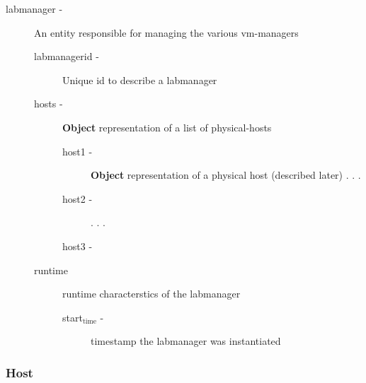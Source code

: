 \documentclass[11pt]{article}
\begin{document}
\begin{description}
\item [labmanager -] An entity responsible for managing the various vm-managers

\begin{description}
\item [labmanagerid -] Unique id to describe a labmanager
\item [hosts -] \textbf{Object} representation of a list of physical-hosts

\begin{description}
\item [host1 -] \textbf{Object} representation of a physical host (described later)
            .
            .
            .
\item [host2 -]
            .
            .
            .
\item [host3 -]
\end{description}

\item [runtime] runtime characterstics of the labmanager

\begin{description}
\item [start$_{\mathrm{time}}$ -] timestamp the labmanager was instantiated
\end{description}

\end{description}

\end{description}
\subsubsection{Host}
\label{sec-3.3.4}
\end{document}
